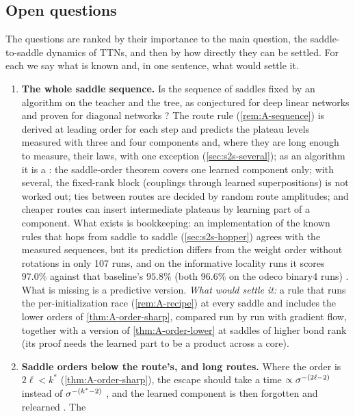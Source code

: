 \subsection{Open questions}\label{sec:open}

The questions are ranked by their importance to the main question, the saddle-to-saddle dynamics of
TTNs, and then by how directly they can be settled. For each we say what is known and, in one sentence,
what would settle it.

\begin{enumerate}[label=\arabic*.,leftmargin=*,itemsep=4pt]
  \item \textbf{The whole saddle sequence.} Is the sequence of saddles fixed by an algorithm on the
    teacher and the tree, as conjectured for deep linear networks \citep{jacot2022saddletosaddle} and
    proven for diagonal networks \citep{pesme2023saddletosaddle}? The route rule (\cref{rem:A-sequence}) is
    derived at leading order for each step and predicts the plateau levels measured with three and four
    components and, where they are long enough to measure, their laws, with one exception
    (\cref{sec:s2s-several}); as an algorithm it is a \conjecture: the saddle-order theorem covers one
    learned component only; with several, the fixed-rank block (couplings through learned superpositions)
    is not worked out; ties between routes are decided by random route amplitudes; and cheaper routes can
    insert intermediate plateaus by learning part of a component. What exists is bookkeeping: an
    implementation of the known rules that hops from saddle to saddle (\cref{sec:s2s-hopper}) agrees
    with the measured sequences, but its prediction differs from the weight order without rotations in
    only 107 runs, and on the informative locality runs it scores $97.0\%$ against that baseline's $95.8\%$
    (both $96.6\%$ on the odeco binary4 runs) \empirical. What is missing is a predictive version. \emph{What would settle it:} a rule that runs the
    per-initialization race (\cref{rem:A-recipe}) at every saddle and includes the lower orders of
    \cref{thm:A-order-sharp}, compared run by run with gradient flow, together with a version of
    \cref{thm:A-order-lower} at saddles of higher bond rank (its proof needs the learned part to be a
    product across a core).
  \item \textbf{Saddle orders below the route's, and long routes.} Where the order is $2\ell<k^*$
    (\cref{thm:A-order-sharp}), the escape should take a time $\propto\sigma^{-(2\ell-2)}$ instead of
    $\sigma^{-(k^*-2)}$ \derived, and the learned component is then forgotten and relearned \empirical. The

\end{enumerate}
